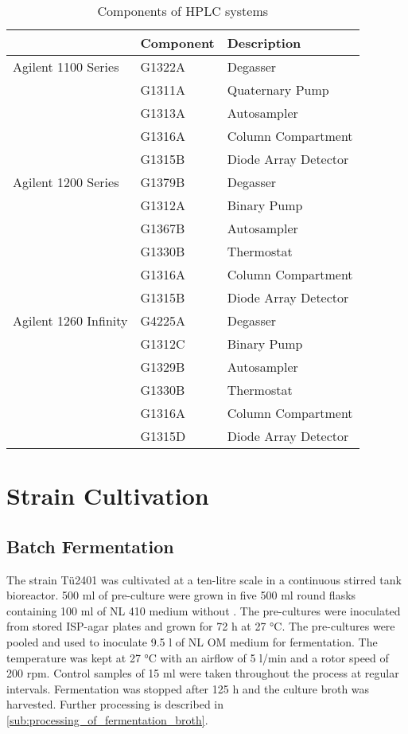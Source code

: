 \begin{table}[H]
	\caption{Components of HPLC systems}
	\label{tab:HPLCtab}
	\centering
	\begin{tabularx}{\textwidth}{XXX}
		\toprule
						& \textbf{Component}		& \textbf{Description}	\\
		\midrule
		Agilent 1100 Series		&	G1322A		&	Degasser			\\
								&	G1311A		&	Quaternary Pump		\\
								&	G1313A		&	Autosampler			\\
								&	G1316A		&	Column Compartment	\\
								&	G1315B		&	Diode Array Detector	\\
		Agilent 1200 Series		&	G1379B		&	Degasser			\\
								&	G1312A		&	Binary Pump			\\
								&	G1367B		&	Autosampler			\\
								&	G1330B		&	Thermostat			\\
								&	G1316A		&	Column Compartment	\\
								&	G1315B		&	Diode Array Detector	\\
		Agilent 1260 Infinity	&	G4225A		&	Degasser			\\
								&	G1312C		&	Binary Pump			\\
								&	G1329B		&	Autosampler			\\
								&	G1330B		&	Thermostat			\\
								&	G1316A		&	Column Compartment	\\
								&	G1315D		&	Diode Array Detector	\\


		\bottomrule
	\end{tabularx}
\end{table}


\section{Strain Cultivation} %
\label{sec:strain_cultivation}

	\subsection{Batch Fermentation} %
	\label{sub:fermentation}
	The strain Tü2401 was cultivated at a ten-litre scale in a continuous stirred tank bioreactor. 500 ml of pre-culture were grown in five 500 ml round flasks containing 100 ml of NL 410 medium without . The pre-cultures were inoculated from stored ISP-agar plates and grown for 72 h at 27 °C. The pre-cultures were pooled and used to inoculate 9.5 l of NL OM medium for fermentation. The temperature was kept at 27 °C with an airflow of 5 l/min and a rotor speed of 200 rpm. Control samples of 15 ml were taken throughout the process at regular intervals. Fermentation was stopped after 125 h and the culture broth was harvested. Further processing is described in \ref{sub:processing_of_fermentation_broth}.
	
